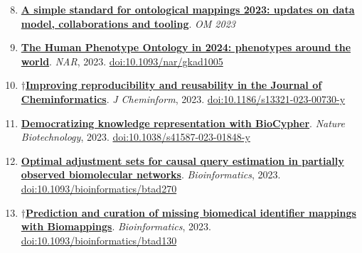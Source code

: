 \documentclass[10pt,a4paper,sans]{moderncv} %
\newcommand{\wikidata}[2]{\href{https://bioregistry.io/wikidata:#1?provider=scholia}{{#2}}}
\begin{document}
    \begin{enumerate}
    \setcounter{enumi}{7}
    \itemsep0.5em
        \item
        \wikidata{Q125846652}{\textbf{A simple standard for ontological mappings 2023: updates on data model, collaborations and tooling}}.
    \textit{OM 2023}
        \item
        \wikidata{Q123608235}{\textbf{The Human Phenotype Ontology in 2024: phenotypes around the world}}.
    \textit{NAR}, 2023.  {\scriptsize \href{https://bioregistry.io/doi:10.1093/NAR/GKAD1005}{doi:10.1093/nar/gkad1005}}
        \item
        $\dagger$\wikidata{Q120200936}{\textbf{Improving reproducibility and reusability in the Journal of Cheminformatics}}.
    \textit{J Cheminform}, 2023.  {\scriptsize \href{https://bioregistry.io/doi:10.1186/S13321-023-00730-Y}{doi:10.1186/s13321-023-00730-y}}
        \item
        \wikidata{Q119813997}{\textbf{Democratizing knowledge representation with BioCypher}}.
    \textit{Nature Biotechnology}, 2023.  {\scriptsize \href{https://bioregistry.io/doi:10.1038/S41587-023-01848-Y}{doi:10.1038/s41587-023-01848-y}}
        \item
        \wikidata{Q122028693}{\textbf{Optimal adjustment sets for causal query estimation in partially observed biomolecular networks}}.
    \textit{Bioinformatics}, 2023.  {\scriptsize \href{https://bioregistry.io/doi:10.1093/BIOINFORMATICS/BTAD270}{doi:10.1093/bioinformatics/btad270}}
        \item
        $\dagger$\wikidata{Q118774152}{\textbf{Prediction and curation of missing biomedical identifier mappings with Biomappings}}.
    \textit{Bioinformatics}, 2023.  {\scriptsize \href{https://bioregistry.io/doi:10.1093/BIOINFORMATICS/BTAD130}{doi:10.1093/bioinformatics/btad130}}
    \end{enumerate}
\end{document}
